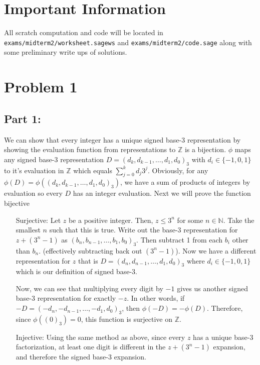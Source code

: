 \documentclass[12pt,letterpaper]{article}
\begin{document}
\section*{Important Information}
All scratch computation and code will be located in \texttt{exams/midterm2/worksheet.sagews} and \texttt{exams/midterm2/code.sage} along with some preliminary write ups of solutions.

\section*{Problem 1}
\subsection*{Part 1:}

    We can show that every integer has a unique signed base-3 representation by showing the evaluation function from representations to $\mathbb{Z}$ is a bijection. $\phi$ maps any signed base-3 representation $D=(d_k,d_{k-1},\dots,d_1,d_0)_3$ with $d_i\in\{-1,0,1\}$ to it's evaluation in $\mathbb{Z}$ which equals $\sum_{j=0}^k d_j3^j$. Obviously, for any $\phi(D)=\phi((d_k,d_{k-1},\dots,d_1,d_0)_3)$, we have a sum of products of integers by evaluation so every $D$ has an integer evaluation. Next we will prove the function bijective
    \begin{itemize}
        \item[Surjective:] Let $z$ be a positive integer. Then, $z\leq 3^n$ for some $n\in\mathbb{N}$. Take the smallest $n$ such that this is true. Write out the base-3 representation for $z + (3^n-1)$ as $(b_n,b_{n-1},\dots,b_1,b_0)_3$. Then subtract 1 from each $b_i$ other than $b_n$. (effectively subtracting back out $(3^n-1)$). Now we have a different representation for $z$ that is $D = (d_n,d_{n-1},\dots,d_1,d_0)_3$ where $d_i\in\{ -1,0,1\}$ which is our definition of signed base-3.
        
        Now, we can see that multiplying every digit by $-1$ gives us another signed base-3 representation for exactly $-z$. In other words, if $-D=(-d_n,-d_{n-1},\dots,-d_1,d_0)_3$, then $\phi(-D) = -\phi(D)$. Therefore, since $\phi((0)_3) = 0$, this function is surjective on $\mathbb{Z}$.
        \item[Injective:] Using the same method as above, since every $z$ has a unique base-3 factorization, at least one digit is different in the $z+(3^n-1)$ expansion, and therefore the signed base-3 expansion.
    \end{itemize}
    
\end{document}

